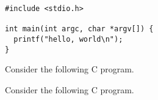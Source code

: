 \documentclass{article}
\begin{document}
\begin{lrbox}{\myboxa}\begin{minipage}{\textwidth}
\begin{lstlisting}[]
#include <stdio.h>

int main(int argc, char *argv[]) {
  printf("hello, world\n");
}
\end{lstlisting}
\end{minipage}
\end{lrbox}

\begin{question}{6}
Consider the following C program.\par
\noindent\usebox\myboxa
\end{question}

\begin{solution}
Consider the following C program.\par
\noindent\usebox\myboxa
\end{solution}
\printsolutions 
\end{document}
